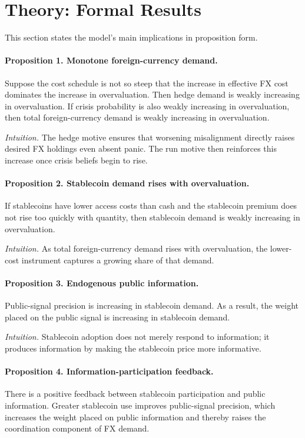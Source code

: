 \documentclass[12pt]{article}
\begin{document}
\section{Theory: Formal Results}

This section states the model's main implications in proposition form.

\paragraph{Proposition 1. Monotone foreign-currency demand.}
Suppose the cost schedule is not so steep that the increase in effective FX cost dominates the increase in overvaluation. Then hedge demand is weakly increasing in overvaluation. If crisis probability is also weakly increasing in overvaluation, then total foreign-currency demand is weakly increasing in overvaluation.

\emph{Intuition.} The hedge motive ensures that worsening misalignment directly raises desired FX holdings even absent panic. The run motive then reinforces this increase once crisis beliefs begin to rise.

\paragraph{Proposition 2. Stablecoin demand rises with overvaluation.}
If stablecoins have lower access costs than cash and the stablecoin premium does not rise too quickly with quantity, then stablecoin demand is weakly increasing in overvaluation.

\emph{Intuition.} As total foreign-currency demand rises with overvaluation, the lower-cost instrument captures a growing share of that demand.

\paragraph{Proposition 3. Endogenous public information.}
Public-signal precision is increasing in stablecoin demand. As a result, the weight placed on the public signal is increasing in stablecoin demand.

\emph{Intuition.} Stablecoin adoption does not merely respond to information; it produces information by making the stablecoin price more informative.

\paragraph{Proposition 4. Information-participation feedback.}
There is a positive feedback between stablecoin participation and public information. Greater stablecoin use improves public-signal precision, which increases the weight placed on public information and thereby raises the coordination component of FX demand.
\end{document}

